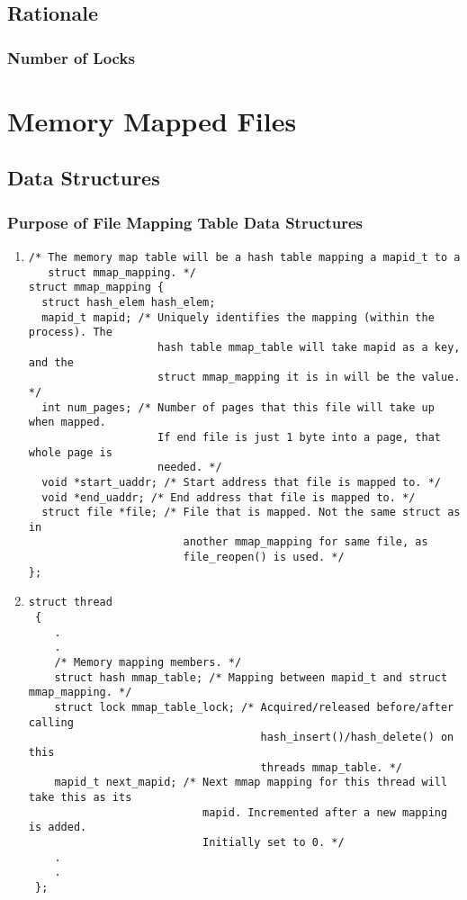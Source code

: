 \documentclass{article}
\renewcommand{\_}{\char`_}
\begin{document}
\subsection{Rationale}

\subsubsection{Number of Locks}

\section{Memory Mapped Files}

\subsection{Data Structures}

\subsubsection{Purpose of File Mapping Table Data Structures}
\begin{enumerate}

\item

\begin{lstlisting}
/* The memory map table will be a hash table mapping a mapid_t to a
   struct mmap_mapping. */
struct mmap_mapping {
  struct hash_elem hash_elem;
  mapid_t mapid; /* Uniquely identifies the mapping (within the process). The
                    hash table mmap_table will take mapid as a key, and the
                    struct mmap_mapping it is in will be the value. */
  int num_pages; /* Number of pages that this file will take up when mapped.
                    If end file is just 1 byte into a page, that whole page is
                    needed. */
  void *start_uaddr; /* Start address that file is mapped to. */
  void *end_uaddr; /* End address that file is mapped to. */
  struct file *file; /* File that is mapped. Not the same struct as in
                        another mmap_mapping for same file, as
                        file_reopen() is used. */
};
\end{lstlisting}

\item

\begin{lstlisting}
struct thread 
 {
    .
    .
    /* Memory mapping members. */
    struct hash mmap_table; /* Mapping between mapid_t and struct mmap_mapping. */
    struct lock mmap_table_lock; /* Acquired/released before/after calling
                                    hash_insert()/hash_delete() on this
                                    threads mmap_table. */
    mapid_t next_mapid; /* Next mmap mapping for this thread will take this as its
                           mapid. Incremented after a new mapping is added.
                           Initially set to 0. */
    .
    .
 };
\end{lstlisting}

\end{enumerate}
\end{document}
